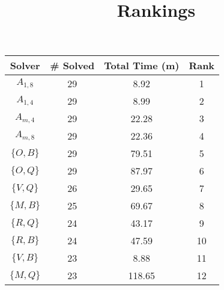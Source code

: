 \documentclass{article}
\title{Rankings}
\begin{document}
\maketitle

\begin{table}[ht!]
\centering

\begin{tabular}{|c||c|c||c|}\hline
Solver   & \# Solved & Total Time (m) & Rank \\\hline\hline
$A_{1,8}$   &  29    &  8.92     & 1\\\hline
$A_{1,4}$   &  29    &  8.99     & 2\\\hline
$A_{m,4}$   &  29    &  22.28    & 3\\\hline
$A_{m,8}$   &  29    &  22.36    & 4\\\hline
$\{O, B\}$  &  29    &  79.51    & 5\\\hline
$\{O, Q\}$  &  29    &  87.97    & 6\\\hline
$\{V, Q\}$  &  26    &  29.65    & 7\\\hline
$\{M, B\}$  &  25    &  69.67    & 8\\\hline
$\{R, Q\}$  &  24    &  43.17    & 9\\\hline
$\{R, B\}$  &  24    &  47.59    & 10\\\hline
$\{V, B\}$  &  23    &  8.88     & 11\\\hline
$\{M, Q\}$  &  23    &  118.65   & 12\\\hline
\end{tabular}
\end{table}
\end{document}
